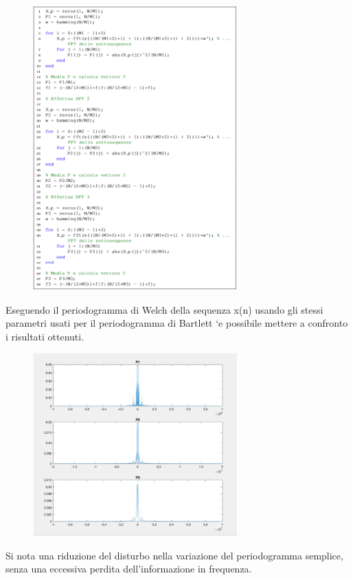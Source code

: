 \begin{figure}[H]
	\centering
	\includegraphics[width=0.7\textwidth]{images/cap4/matlab_welch}
\end{figure}

Eseguendo il periodogramma di Welch della sequenza x(n) usando gli stessi parametri 
usati per il periodogramma di Bartlett `e possibile mettere a confronto i risultati 
ottenuti.

\begin{figure}[H]
	\centering
	\includegraphics[width=0.7\textwidth]{images/cap4/plot_welch}
\end{figure}


Si nota una riduzione del disturbo nella variazione del periodogramma semplice, 
senza una eccessiva perdita dell’informazione in frequenza.

